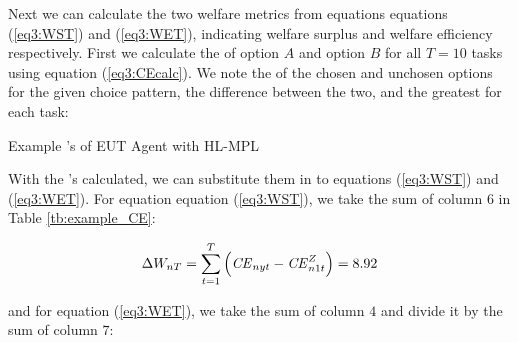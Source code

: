 \documentclass[../main.tex]{subfiles}
\begin{document}
\noindent Next we can calculate the two welfare metrics from equations equations (\ref{eq3:WST}) and (\ref{eq3:WET}), indicating welfare surplus and welfare efficiency respectively.
First we calculate the {\CE} of option $A$ and option $B$ for all $T = 10$ tasks using equation (\ref{eq3:CEcalc}). 
We note the {\CE} of the chosen and unchosen options for the given choice pattern, the difference between the two, and the greatest {\CE} for each task:

\begin{table}[ht]
	\centering
	\setlength{\tabcolsep}{1pt}
	\caption{ Example {\CE}'s of EUT Agent with HL-MPL}
	\label{tb:example_CE}
	\begin{adjustbox}{width=1\textwidth}
	\end{adjustbox}
\end{table}

With the {\CE}'s calculated, we can substitute them in to equations (\ref{eq3:WST}) and (\ref{eq3:WET}).
For equation equation (\ref{eq3:WST}), we take the sum of column $6$ in Table \ref{tb:example_CE}:

\begin{equation}
	\label{eq3:example_WST}
	\Delta W_{nT} = \sum_{t=1}^T \left( {\mathit{CE}}_{nyt} - {\mathit{CE}}_{n1t}^Z \right) = 8.92
\end{equation}

\noindent and for equation (\ref{eq3:WET}), we take the sum of column $4$ and divide it by the sum of column $7$:
\end{document}
